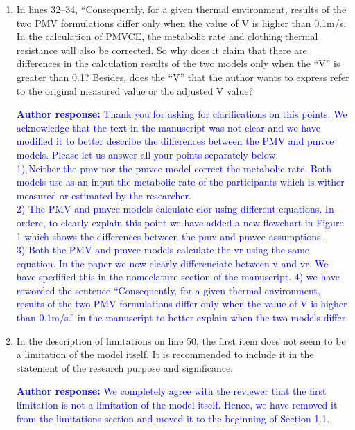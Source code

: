 \documentclass[a4paper, 10pt]{letter}
\newcommand{\response}[1]{\textcolor{blue}{\textbf{Author response:} #1}}
\begin{document}
\begin{letter}
\begin{enumerate}
            \item In lines 32--34, ``Consequently, for a given thermal environment, results of the two PMV formulations differ only when the value of V is higher than 0.1m/s.
            In the calculation of PMVCE, the metabolic rate and clothing thermal resistance will also be corrected.
            So why does it claim that there are differences in the calculation results of the two models only when the ``V'' is greater than 0.1?
            Besides, does the ``V'' that the author wants to express refer to the original measured value or the adjusted V value?

            \response{
                Thank you for asking for clarifications on this points.
                We acknowledge that the text in the manuscript was not clear and we have modified it to better describe the differences between the PMV and \ac{pmvce} models.
                Please let us answer all your points separately below:\\
                1) Neither the \ac{pmv} nor the \ac{pmvce} model correct the metabolic rate.
                Both models use as an input the metabolic rate of the participants which is wither measured or estimated by the researcher.\\
                2) The PMV and \ac{pmvce} models calculate \ac{clor} using different equations.
                In ordere, to clearly explain this point we have added a new flowchart in Figure 1 which shows the differences between the \ac{pmv} and \ac{pmvce} assumptions.\\
                3) Both the PMV and \ac{pmvce} models calculate the \acf{vr} using the same equation.
                In the paper we now clearly differenciate between \acf{v} and \acf{vr}.
                We have spedified this in the nomeclature section of the manuscript.
                4) we have reworded the sentence ``Consequently, for a given thermal environment, results of the two PMV formulations differ only when the value of V is higher than 0.1m/s.'' in the manuscript to better explain when the two models differ.
            }

            \item In the description of limitations on line 50, the first item does not seem to be a limitation of the model itself.
            It is recommended to include it in the statement of the research purpose and significance.

            \response{
                We completely agree with the reviewer that the first limitation is not a limitation of the model itself.
                Hence, we have removed it from the limitations section and moved it to the beginning of Section 1.1.
            }


\end{enumerate}
\end{letter}
\end{document}
